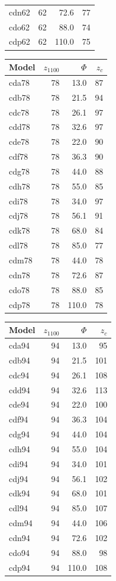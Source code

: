 \documentclass[draft,linenumbers]{agujournal2018}
\begin{document}
\begin{landscape}
\begin{table}
\begin{tabular}[t]{lrrr}
cdn62 & 62 & 72.6 & 77\\
cdo62 & 62 & 88.0 & 74\\
\addlinespace
cdp62 & 62 & 110.0 & 75\\
\bottomrule
\end{tabular}
\centering
\begin{tabular}[t]{lrrr}
\toprule
Model & $z_{1100}$ & $\Phi$ & $z_c$\\
\midrule
cda78 & 78 & 13.0 & 87\\
cdb78 & 78 & 21.5 & 94\\
cdc78 & 78 & 26.1 & 97\\
cdd78 & 78 & 32.6 & 97\\
cde78 & 78 & 22.0 & 90\\
\addlinespace
cdf78 & 78 & 36.3 & 90\\
cdg78 & 78 & 44.0 & 88\\
cdh78 & 78 & 55.0 & 85\\
cdi78 & 78 & 34.0 & 97\\
cdj78 & 78 & 56.1 & 91\\
\addlinespace
cdk78 & 78 & 68.0 & 84\\
cdl78 & 78 & 85.0 & 77\\
cdm78 & 78 & 44.0 & 78\\
cdn78 & 78 & 72.6 & 87\\
cdo78 & 78 & 88.0 & 85\\
\addlinespace
cdp78 & 78 & 110.0 & 78\\
\bottomrule
\end{tabular}
\centering
\begin{tabular}[t]{lrrr}
\toprule
Model & $z_{1100}$ & $\Phi$ & $z_c$\\
\midrule
cda94 & 94 & 13.0 & 95\\
cdb94 & 94 & 21.5 & 101\\
cdc94 & 94 & 26.1 & 108\\
cdd94 & 94 & 32.6 & 113\\
cde94 & 94 & 22.0 & 100\\
\addlinespace
cdf94 & 94 & 36.3 & 104\\
cdg94 & 94 & 44.0 & 104\\
cdh94 & 94 & 55.0 & 104\\
cdi94 & 94 & 34.0 & 101\\
cdj94 & 94 & 56.1 & 102\\
\addlinespace
cdk94 & 94 & 68.0 & 101\\
cdl94 & 94 & 85.0 & 107\\
cdm94 & 94 & 44.0 & 106\\
cdn94 & 94 & 72.6 & 102\\
cdo94 & 94 & 88.0 & 98\\
\addlinespace
cdp94 & 94 & 110.0 & 108\\
\bottomrule
\end{tabular}
\end{table}
\end{landscape}
\end{document}
